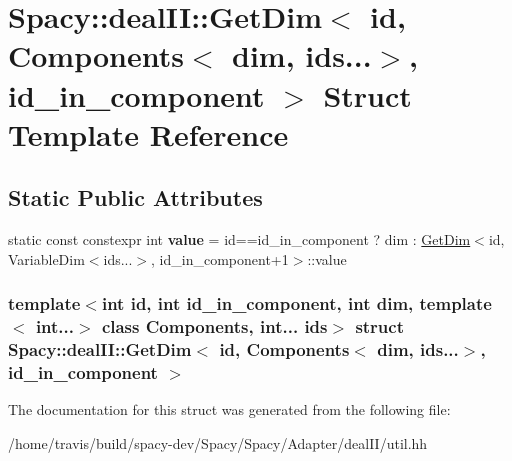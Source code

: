 \hypertarget{structSpacy_1_1dealII_1_1GetDim_3_01id_00_01Components_3_01dim_00_01ids_8_8_8_4_00_01id__in__component_01_4}{\section{\-Spacy\-:\-:deal\-I\-I\-:\-:\-Get\-Dim$<$ id, \-Components$<$ dim, ids...$>$, id\-\_\-in\-\_\-component $>$ \-Struct \-Template \-Reference}
\label{structSpacy_1_1dealII_1_1GetDim_3_01id_00_01Components_3_01dim_00_01ids_8_8_8_4_00_01id__in__component_01_4}
}
\subsection*{\-Static \-Public \-Attributes}
\begin{DoxyCompactItemize}
\item 
\hypertarget{structSpacy_1_1dealII_1_1GetDim_3_01id_00_01Components_3_01dim_00_01ids_8_8_8_4_00_01id__in__component_01_4_ab36373b25de958bd5a0ce630357da6f2}{static const constexpr int {\bfseries value} = id==id\-\_\-in\-\_\-component ? dim \-: \hyperlink{structSpacy_1_1dealII_1_1GetDim}{\-Get\-Dim}$<$id, \-Variable\-Dim$<$ids...$>$, id\-\_\-in\-\_\-component+1$>$\-::value}\label{structSpacy_1_1dealII_1_1GetDim_3_01id_00_01Components_3_01dim_00_01ids_8_8_8_4_00_01id__in__component_01_4_ab36373b25de958bd5a0ce630357da6f2}

\end{DoxyCompactItemize}
\subsubsection*{template$<$int id, int id\-\_\-in\-\_\-component, int dim, template$<$ int...$>$ class \-Components, int... ids$>$ struct Spacy\-::deal\-I\-I\-::\-Get\-Dim$<$ id, Components$<$ dim, ids...$>$, id\-\_\-in\-\_\-component $>$}



\-The documentation for this struct was generated from the following file\-:\begin{DoxyCompactItemize}
\item 
/home/travis/build/spacy-\/dev/\-Spacy/\-Spacy/\-Adapter/deal\-I\-I/util.\-hh\end{DoxyCompactItemize}
